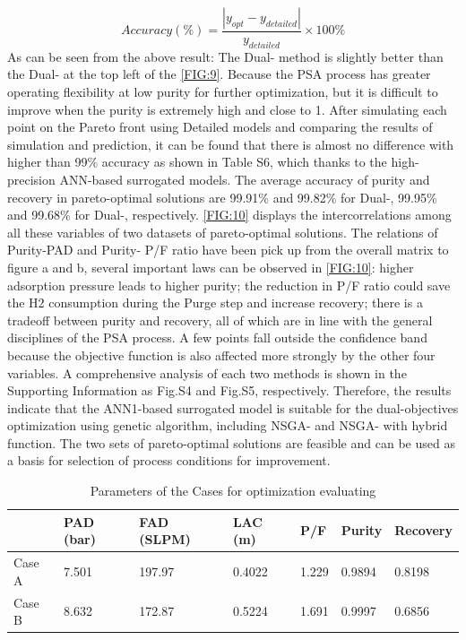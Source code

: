 \documentclass[preprint,12pt]{elsarticle}
\begin{document}
\begin{equation}
	Accuracy (\% ) = \frac{{\left| {{y_{opt}} - {y_{detailed}}} \right|}}{{{y_{detailed}}}} \times 100\% \label{accuracy}
\end{equation}
As can be seen from the above result: The Dual-\uppercase\expandafter{} method is slightly better than the Dual-\uppercase\expandafter{} at the top left of the \cref{FIG:9}. Because the PSA process has greater operating flexibility at low purity for further optimization, but it is difficult to improve when the purity is extremely high and close to 1. After simulating each point on the Pareto front using Detailed models and comparing the results of simulation and prediction, it can be found that there is almost no difference with higher than 99\% accuracy as shown in Table S6, which thanks to the high-precision ANN-based surrogated models. The average accuracy of purity and recovery in pareto-optimal solutions are 99.91\% and 99.82\% for Dual-\uppercase\expandafter{}, 99.95\% and 99.68\% for Dual-\uppercase\expandafter{}, respectively. \cref{FIG:10} displays the intercorrelations among all these variables of two datasets of pareto-optimal solutions. The relations of Purity-PAD and Purity- P/F ratio have been pick up from the overall matrix to figure a and b, several important laws can be observed in \cref{FIG:10}: higher adsorption pressure leads to higher purity; the reduction in P/F ratio could save the H2 consumption during the Purge step and increase recovery; there is a tradeoff between purity and recovery, all of which are in line with the general disciplines of the PSA process. A few points fall outside the confidence band because the objective function is also affected more strongly by the other four variables. A comprehensive analysis of each two methods is shown in the Supporting Information as Fig.S4 and Fig.S5, respectively. Therefore, the results indicate that the ANN1-based surrogated model is suitable for the dual-objectives optimization using genetic algorithm, including NSGA-\uppercase\expandafter{} and NSGA-\uppercase\expandafter{} with hybrid function. The two sets of pareto-optimal solutions are feasible and can be used as a basis for selection of process conditions for improvement.
\begin{table}[]
	\centering
	\caption{Parameters of the Cases for optimization evaluating}
	\begin{tabular}{llllllll}
		\toprule
		& \multicolumn{2}{l}{PAD   (bar)} & FAD   (SLPM) & LAC   (m) & P/F   & Purity & Recovery \\
		\midrule
		Case   A & \multicolumn{2}{l}{7.501}       & 197.97       & 0.4022    & 1.229 & 0.9894 & 0.8198   \\
		Case   B & \multicolumn{2}{l}{8.632}       & 172.87       & 0.5224    & 1.691 & 0.9997 & 0.6856  \\
		\bottomrule
	\end{tabular}
\label{TABLE:7}
\end{table}
\end{document}
